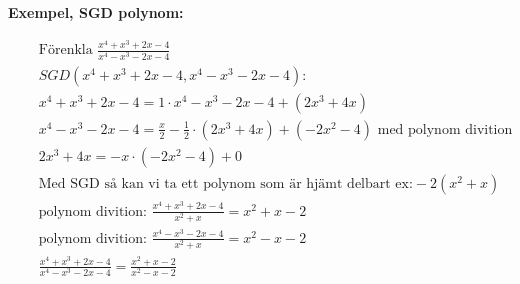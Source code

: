 \newpage
\textbf{Exempel, SGD polynom:}\par
\begin{align*}
  &\quad  \text{Förenkla } \frac{x^4+x^3+2x-4}{x^4-x^3-2x-4} \\
  &\quad  SGD(x^4+x^3+2x-4, x^4-x^3-2x-4):  \\
  &\quad  x^4+x^3+2x-4 = 1 \cdot x^4-x^3-2x-4 + (2x^3 +4x) \\
  &\quad  x^4-x^3-2x-4 = \frac{x}{2}-\frac{1}{2} \cdot (2x^3 +4x) + (-2x^2-4) \text{ med polynom divition} \\
  &\quad      2x^3 +4x = -x \cdot (-2x^2-4) +0 \\
  &\quad  \text{Med SGD så kan vi ta ett polynom som är hjämt delbart ex:} -2(x^2+x) \\
  &\quad  \text{polynom divition: } \frac{x^4+x^3+2x-4}{x^2+x} = x^2+x-2 \\
  &\quad  \text{polynom divition: } \frac{x^4-x^3-2x-4}{x^2+x} = x^2-x-2 \\
  &\quad  \frac{x^4+x^3+2x-4}{x^4-x^3-2x-4} = \frac{x^2+x-2}{x^2-x-2} \\  
\end{align*}
